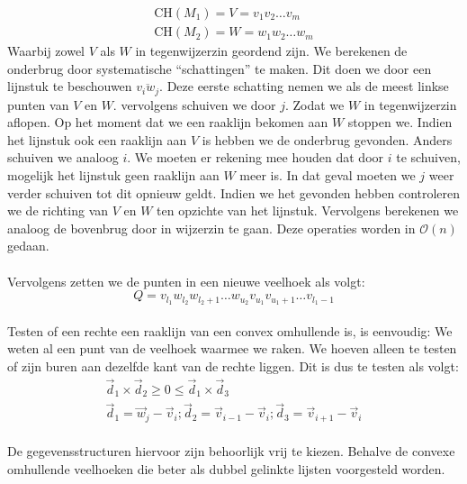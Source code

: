 \documentclass[a4paper,titlepage]{article}
\newcommand{\linep}[1]{\overline{#1}}
\newcommand{\brak}[1]{\left(#1\right)}
\newcommand{\bigoh}[1]{\ensuremath{\mathcal{O}\left(#1\right)}}
\begin{document}
\begin{equation}
\begin{array}{c}
\mbox{CH}\brak{M_1}=V=v_1v_2\ldots v_m\\
\mbox{CH}\brak{M_2}=W=w_1w_2\ldots w_m
\end{array}
\end{equation}
Waarbij zowel $V$ als $W$ in tegenwijzerzin geordend zijn. We berekenen de onderbrug door systematische ``schattingen'' te maken. Dit doen we door een lijnstuk te beschouwen $\linep{v_iw_j}$. Deze eerste schatting nemen we als de meest linkse punten van $V$ en $W$. vervolgens schuiven we door $j$. Zodat we $W$ in tegenwijzerzin aflopen. Op het moment dat we een raaklijn bekomen aan $W$ stoppen we. Indien het lijnstuk ook een raaklijn aan $V$ is hebben we de onderbrug gevonden. Anders schuiven we analoog $i$. We moeten er rekening mee houden dat door $i$ te schuiven, mogelijk het lijnstuk geen raaklijn aan $W$ meer is. In dat geval moeten we $j$ weer verder schuiven tot dit opnieuw geldt. Indien we het gevonden hebben controleren we de richting van $V$ en $W$ ten opzichte van het lijnstuk. Vervolgens berekenen we analoog de bovenbrug door in wijzerzin te gaan. Deze operaties worden in \bigoh{n} gedaan.
\paragraph{}
Vervolgens zetten we de punten in een nieuwe veelhoek als volgt:
\begin{equation}
Q=v_{l_1}w_{l_2}w_{l_2+1}\ldots w_{u_2}v_{u_1}v_{u_1+1}\ldots v_{l_1-1}
\end{equation}
\paragraph{}
Testen of een rechte een raaklijn van een convex omhullende is, is eenvoudig: We weten al een punt van de veelhoek waarmee we raken. We hoeven alleen te testen of zijn buren aan dezelfde kant van de rechte liggen. Dit is dus te testen als volgt:
\begin{equation}
\begin{array}{c}
\vec{d}_1\times\vec{d}_2\geq0\leq\vec{d}_1\times\vec{d}_3\\
\vec{d}_1=\vec{w}_j-\vec{v}_i;\vec{d}_2=\vec{v}_{i-1}-\vec{v}_i;\vec{d}_3=\vec{v}_{i+1}-\vec{v}_i
\end{array}
\end{equation}
\paragraph{}
De gegevensstructuren hiervoor zijn behoorlijk vrij te kiezen. Behalve de convexe omhullende veelhoeken die beter als dubbel gelinkte lijsten voorgesteld worden.
\end{document}
